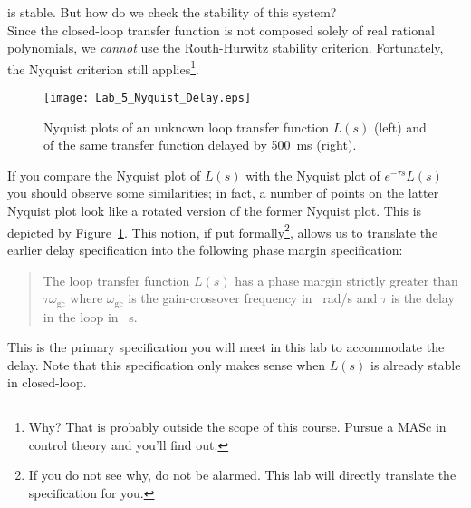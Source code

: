 \begin{center}
\end{center}
%
is stable. But how do we check the stability of this system? \\
Since the closed-loop transfer function is not composed solely of real rational polynomials, we \emph{cannot} use the Routh-Hurwitz stability criterion. Fortunately, the Nyquist criterion still applies\footnote{Why? That is probably outside the scope of this course. Pursue a MASc in control theory and you'll find out.}.
%
\begin{figure}
  \centering
  \texttt{[image: Lab\_5\_Nyquist\_Delay.eps]}
  \caption[Nyquist Plot of Transfer Functions with and without a delay.]{Nyquist plots of an unknown loop transfer function \(L(s)\) (left) and of the same transfer function delayed by \SI{500}{\milli\second} (right).}
  \label{fig:lab5:delay}
\end{figure}
%
If you compare the Nyquist plot of \(L(s)\) with the Nyquist plot of \(e^{-\tau s} L(s)\) you should observe some similarities;
in fact, a number of points on the latter Nyquist plot look like a rotated version of the former Nyquist plot.
This is depicted by Figure~\ref{fig:lab5:delay}.
This notion, if put formally\footnote{If you do not see why, do not be alarmed. This lab will directly translate the specification for you.}, allows us to translate the earlier delay specification into the following phase margin specification:
\begin{quote}
  The loop transfer function \(L(s)\) has a phase margin strictly greater than \(\tau \omega_{\mathrm{gc}}\) where \(\omega_{\mathrm{gc}}\) is the gain-crossover frequency in \SI{}{\radian/s} and \(\tau\) is the delay in the loop in \SI{}{\second}.
\end{quote}
This is the primary specification you will meet in this lab to accommodate the delay.
Note that this specification only makes sense when \(L(s)\) is already stable in closed-loop.


